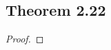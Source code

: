 \documentclass[../../main.tex]{subfiles}
\begin{document}
\subsection{Theorem 2.22}
\begin{wts}

\end{wts}
\begin{proof}

\end{proof}
\end{document}
